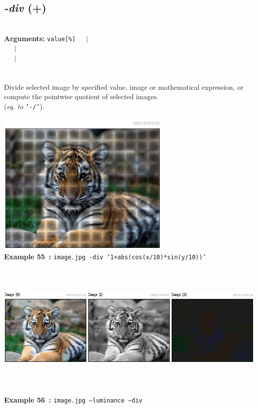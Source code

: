 \documentclass[a4paper,11pt,twoside]{book}
\begin{document}
\subsection{\emph{-div} (+)}\vspace*{-0.5em}
~\\\textbf{Arguments: } 
{\small \texttt{value[\%]}}~~~$|$\\
\hspace*{2.2cm}{\small \texttt{[image]}}~~~$|$\\
~~~$|$\\
\\~\\
Divide selected image by specified value, image or mathematical expression,
or compute the pointwise quotient of selected images.
~\\(\emph{eq. to} {\small \texttt{'-/'}}).
\begin{center}\includegraphics[keepaspectratio=true,height=7cm,width=\textwidth]{img/gmic_def55.jpg}\\
{\footnotesize \textbf{Example 55~:} \texttt{image.jpg -div '1+abs(cos(x/10)*sin(y/10))'}}
\\\includegraphics[keepaspectratio=true,height=7cm,width=\textwidth]{img/gmic_def56.jpg}\\
{\footnotesize \textbf{Example 56~:} \texttt{image.jpg --luminance --div}}
\end{center}
\end{document}
